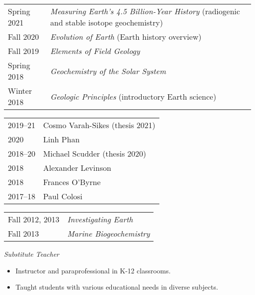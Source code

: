 \begin{tabular}{p{.15\linewidth} p{.85\linewidth}} %
	Spring 2021 & \textit{Measuring Earth’s 4.5 Billion-Year History} (radiogenic and stable isotope geochemistry)\\
	Fall 2020 & \textit{Evolution of Earth} (Earth history overview) \\
	Fall 2019 & \textit{Elements of Field Geology}\\
	Spring 2018 & \textit{Geochemistry of the Solar System}\\
	Winter 2018 & \textit{Geologic Principles} (introductory Earth science)
\end{tabular}

\begin{tabular}{ll}
	2019--21 & Cosmo Varah-Sikes (thesis 2021)\\
	2020 & Linh Phan \\
	2018--20 & Michael Scudder (thesis 2020) \\
	2018 & Alexander Levinson \\
	2018 & Frances O'Byrne \\
	2017--18 & Paul Colosi
\end{tabular}

\begin{tabular}{p{.15\linewidth} p{.85\linewidth}} %
Fall 2012, 2013 & \textit{Investigating Earth}\\
Fall 2013 & \textit{Marine Biogeochemistry}
\end{tabular}

\textit{Substitute Teacher}
\begin{itemize}
	\item Instructor and paraprofessional in K-12 classrooms.
	\item Taught students with various educational needs in diverse subjects.
\end{itemize}
